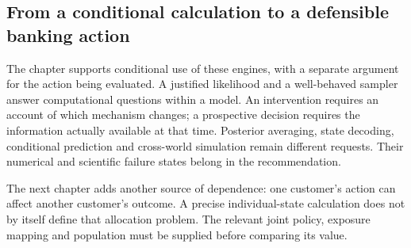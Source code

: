 \subsection{From a conditional calculation to a defensible banking action}

The chapter supports conditional use of these engines, with a separate argument
for the action being evaluated. A justified likelihood and a well-behaved
sampler answer computational questions within a model. An intervention requires
an account of which mechanism changes; a prospective decision requires the
information actually available at that time. Posterior averaging, state decoding,
conditional prediction and cross-world simulation remain different requests.
Their numerical and scientific failure states belong in the recommendation.

The next chapter adds another source of dependence: one customer's action can
affect another customer's outcome. A precise individual-state calculation does
not by itself define that allocation problem. The relevant joint policy,
exposure mapping and population must be supplied before comparing its value.

